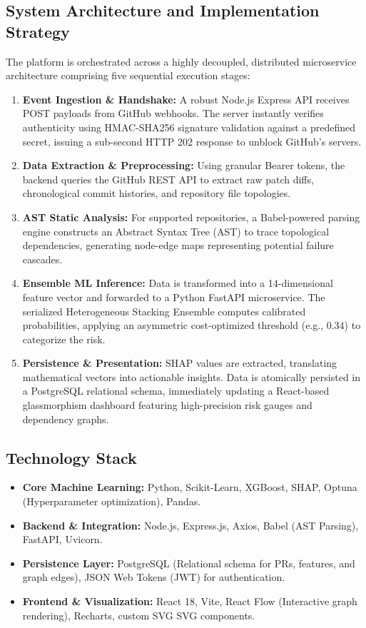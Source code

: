 \documentclass[12pt, a4paper]{article}
\begin{document}
\subsection{System Architecture and Implementation Strategy}
The platform is orchestrated across a highly decoupled, distributed microservice architecture comprising five sequential execution stages:
\begin{enumerate}
    \item \textbf{Event Ingestion \& Handshake:} A robust Node.js Express API receives POST payloads from GitHub webhooks. The server instantly verifies authenticity using HMAC-SHA256 signature validation against a predefined secret, issuing a sub-second HTTP 202 response to unblock GitHub's servers.
    \item \textbf{Data Extraction \& Preprocessing:} Using granular Bearer tokens, the backend queries the GitHub REST API to extract raw patch diffs, chronological commit histories, and repository file topologies.
    \item \textbf{AST Static Analysis:} For supported repositories, a Babel-powered parsing engine constructs an Abstract Syntax Tree (AST) to trace topological dependencies, generating node-edge maps representing potential failure cascades.
    \item \textbf{Ensemble ML Inference:} Data is transformed into a 14-dimensional feature vector and forwarded to a Python FastAPI microservice. The serialized Heterogeneous Stacking Ensemble computes calibrated probabilities, applying an asymmetric cost-optimized threshold (e.g., 0.34) to categorize the risk.
    \item \textbf{Persistence \& Presentation:} SHAP values are extracted, translating mathematical vectors into actionable insights. Data is atomically persisted in a PostgreSQL relational schema, immediately updating a React-based glassmorphism dashboard featuring high-precision risk gauges and dependency graphs.
\end{enumerate}

\subsection{Technology Stack}
\begin{itemize}
    \item \textbf{Core Machine Learning:} Python, Scikit-Learn, XGBoost, SHAP, Optuna (Hyperparameter optimization), Pandas.
    \item \textbf{Backend \& Integration:} Node.js, Express.js, Axios, Babel (AST Parsing), FastAPI, Uvicorn.
    \item \textbf{Persistence Layer:} PostgreSQL (Relational schema for PRs, features, and graph edges), JSON Web Tokens (JWT) for authentication.
    \item \textbf{Frontend \& Visualization:} React 18, Vite, React Flow (Interactive graph rendering), Recharts, custom SVG SVG components.
\end{itemize}
\end{document}

